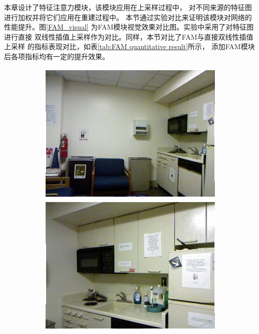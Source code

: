 本章设计了特征注意力模块，该模块应用在上采样过程中，
对不同来源的特征图进行加权并将它们应用在重建过程中。
本节通过实验对比来证明该模块对网络的性能提升。图\ref{FAM_visual}
为FAM模块视觉效果对比图。实验中采用了对特征图进行直接
双线性插值上采样作为对比。同样，本节对比了FAM与直接双线性插值上采样
的指标表现对比，如表\ref{tab:FAM quantitative result}所示，
添加FAM模块后各项指标均有一定的提升效果。
\begin{figure}[htb]
  \centering
  \begin{subfigure}{0.24\linewidth}
    \begin{minipage}[b]{1\linewidth}
    \includegraphics[width=1\linewidth]{figure/Without_FAM/0.png}\vspace{4pt}
    \includegraphics[width=1\linewidth]{figure/Without_FAM/1.png}\vspace{4pt}

\end{minipage}
\end{subfigure}
\end{figure}
